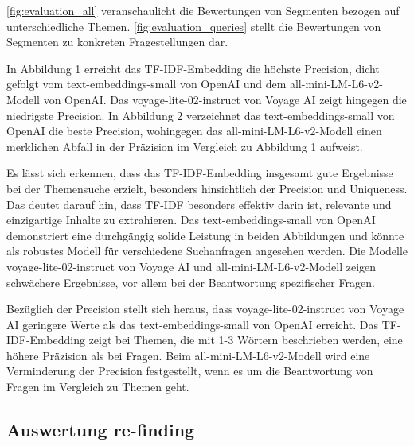 \autoref{fig:evaluation_all} veranschaulicht die Bewertungen von Segmenten bezogen auf unterschiedliche Themen. \autoref{fig:evaluation_queries} stellt die Bewertungen von Segmenten zu konkreten Fragestellungen dar.

In Abbildung 1 erreicht das TF-IDF-Embedding die höchste Precision, dicht gefolgt vom text-embeddings-small von OpenAI und dem all-mini-LM-L6-v2-Modell von OpenAI. 
Das voyage-lite-02-instruct von Voyage AI zeigt hingegen die niedrigste Precision.
In Abbildung 2 verzeichnet das text-embeddings-small von OpenAI die beste Precision, wohingegen das all-mini-LM-L6-v2-Modell einen merklichen Abfall in der Präzision im Vergleich zu Abbildung 1 aufweist.

Es lässt sich erkennen, dass das TF-IDF-Embedding insgesamt gute Ergebnisse bei der Themensuche erzielt, besonders hinsichtlich der Precision und Uniqueness. 
Das deutet darauf hin, dass TF-IDF besonders effektiv darin ist, relevante und einzigartige Inhalte zu extrahieren.
Das text-embeddings-small von OpenAI demonstriert eine durchgängig solide Leistung in beiden Abbildungen und könnte als robustes Modell für verschiedene Suchanfragen angesehen werden.
Die Modelle voyage-lite-02-instruct von Voyage AI und all-mini-LM-L6-v2-Modell zeigen schwächere Ergebnisse, vor allem bei der Beantwortung spezifischer Fragen.

Bezüglich der Precision stellt sich heraus, dass voyage-lite-02-instruct von Voyage AI geringere Werte als das text-embeddings-small von OpenAI erreicht. 
Das TF-IDF-Embedding zeigt bei Themen, die mit 1-3 Wörtern beschrieben werden, eine höhere Präzision als bei Fragen. 
Beim all-mini-LM-L6-v2-Modell wird eine Verminderung der Precision festgestellt, wenn es um die Beantwortung von Fragen im Vergleich zu Themen geht.







\subsection{Auswertung re-finding}

